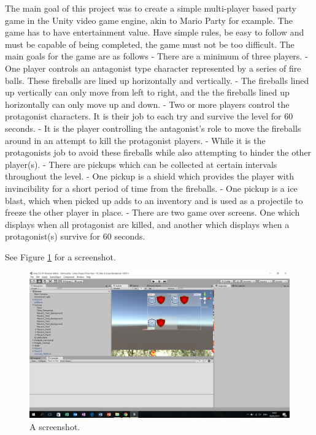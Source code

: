 \documentclass[10pt,a4paperpaper,openright]{book}
\begin{document}
The main goal of this project was to create a simple multi-player based
party game in the Unity video game engine, akin to Mario Party for
example. The game has to have entertainment value. Have simple rules, be
easy to follow and must be capable of being completed, the game must not
be too difficult. The main goals for the game are as follows - There are
a minimum of three players. - One player controls an antagonist type
character represented by a series of fire balls. These fireballs are
lined up horizontally and vertically. - The fireballs lined up
vertically can only move from left to right, and the the fireballs lined
up horizontally can only move up and down. - Two or more players control
the protagonist characters. It is their job to each try and survive the
level for 60 seconds. - It is the player controlling the antagonist's
role to move the fireballs around in an attempt to kill the protagonist
players. - While it is the protagonists job to avoid these fireballs
while also attempting to hinder the other player(s). - There are pickups
which can be collected at certain intervals throughout the level. - One
pickup is a shield which provides the player with invincibility for a
short period of time from the fireballs. - One pickup is a ice blast,
which when picked up adds to an inventory and is used as a projectile to
freeze the other player in place. - There are two game over screens. One
which displays when all protagonist are killed, and another which
displays when a protagonist(s) survive for 60 seconds.

See Figure \ref{image1} for a screenshot.

\begin{figure}
\centering
\includegraphics{./03_figures/chapter01/Image1.png}
\caption{A screenshot. \label{image1}}
\end{figure}
\end{document}
